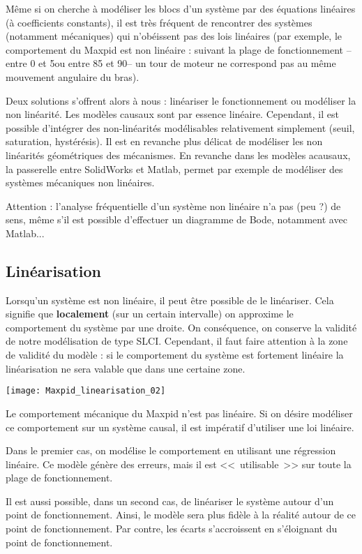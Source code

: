 Même si on cherche à modéliser les blocs d'un système par des équations linéaires (à coefficients constants), il est très fréquent de rencontrer des systèmes (notamment mécaniques) qui n'obéissent pas des lois linéaires (par exemple, le comportement du Maxpid est non linéaire : suivant la plage de fonctionnement -- entre 0 et 5\textdegree ou entre 85 et 90\textdegree -- un tour de moteur ne correspond pas au même mouvement angulaire du bras). 

Deux solutions s'offrent alors à nous : linéariser le fonctionnement ou modéliser la non linéarité. 
Les modèles causaux sont par essence linéaire. Cependant, il est possible d'intégrer des non-linéarités modélisables relativement simplement (seuil, saturation, hystérésis). Il est en revanche plus délicat de modéliser les non linéarités géométriques des mécanismes. 
En revanche dans les modèles acausaux, la passerelle entre SolidWorks et Matlab, permet par exemple de modéliser des systèmes mécaniques non linéaires.

\begin{warn}
Attention : l'analyse fréquentielle d'un système non linéaire n'a pas (peu ?) de sens, même s'il est possible d'effectuer un diagramme de Bode, notamment avec Matlab...
\end{warn}

\subsection{Linéarisation}
Lorsqu'un système est non linéaire, il peut être possible de le linéariser. Cela signifie que \textbf{localement} (sur un certain intervalle) on approxime le comportement du système par une droite. On conséquence, on conserve la validité de notre modélisation de type SLCI. Cependant, il faut faire attention à la zone de validité du modèle : si le comportement du système est fortement linéaire la linéarisation ne sera valable que dans une certaine zone.


\begin{marginfigure}[2cm]
\texttt{[image: Maxpid\_linearisation\_02]}
\end{marginfigure}

\begin{exemple}
Le comportement mécanique du Maxpid n'est pas linéaire. Si on désire modéliser ce comportement sur un système causal, il est impératif d'utiliser une loi linéaire. 

Dans le premier cas, on modélise le comportement en utilisant une régression linéaire. 
Ce modèle génère des erreurs, mais il est <<~utilisable~>> sur toute la plage de fonctionnement. 

Il est aussi possible, dans un second cas, de linéariser le système autour d'un point de fonctionnement. Ainsi, le modèle sera plus fidèle à la réalité autour de ce point de fonctionnement. Par contre, les écarts s'accroissent en s'éloignant du point de fonctionnement. 

\end{exemple}

